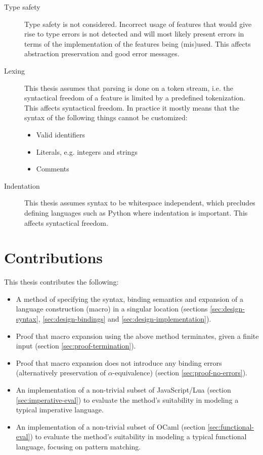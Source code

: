 \documentclass{kththesis}
\begin{document}
\begin{description}
  \item[Type safety] Type safety is not considered. Incorrect usage of features that would give rise to type errors is not detected and will most likely present errors in terms of the implementation of the features being (mis)used. This affects abstraction preservation and good error messages.

  \item[Lexing] This thesis assumes that parsing is done on a token stream, i.e. the syntactical freedom of a feature is limited by a predefined tokenization. This affects syntactical freedom. In practice it mostly means that the syntax of the following things cannot be customized:
  \begin{itemize}
    \item Valid identifiers
    \item Literals, e.g. integers and strings
    \item Comments
  \end{itemize}

  \item[Indentation] This thesis assumes syntax to be whitespace independent, which precludes defining languages such as Python where indentation is important. This affects syntactical freedom.
\end{description}

\section{Contributions}

This thesis contributes the following:

\begin{itemize}
  \item A method of specifying the syntax, binding semantics and expansion of a language construction (macro) in a singular location (sections \ref{sec:design-syntax}, \ref{sec:design-bindings} and \ref{sec:design-implementation}).
  \item Proof that macro expansion using the above method terminates, given a finite input (section \ref{sec:proof-termination}).
  \item Proof that macro expansion does not introduce any binding errors (alternatively preservation of $\alpha$-equivalence) (section \ref{sec:proof-no-errors}).
  \item An implementation of a non-trivial subset of JavaScript/Lua (section \ref{sec:imperative-eval}) to evaluate the method's suitability in modeling a typical imperative language.
  \item An implementation of a non-trivial subset of OCaml (section \ref{sec:functional-eval}) to evaluate the method's suitability in modeling a typical functional language, focusing on pattern matching.
\end{itemize}
\end{document}

